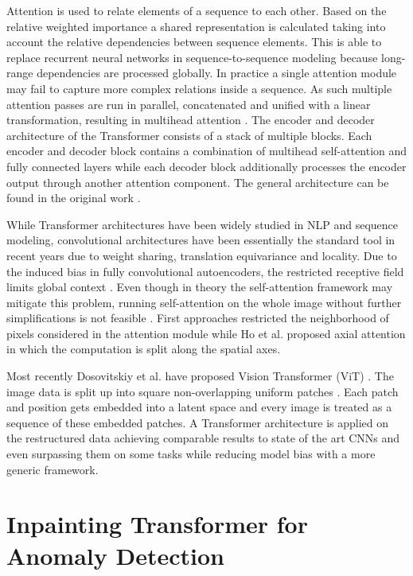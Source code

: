 \documentclass[final,5p,times,twocolumn]{elsarticle}
\begin{document}
	Attention is used to relate elements of a sequence to each other. Based on the relative weighted importance a shared representation is calculated taking into account the relative dependencies between sequence elements.
	This is able to replace recurrent neural networks in sequence-to-sequence modeling because long-range dependencies are processed globally.
	In practice a single attention module may fail to capture more complex relations inside a sequence.
	As such multiple attention passes are run in parallel, concatenated and unified with a linear transformation, resulting in multihead attention \cite{NIPS2017_3f5ee243}.
	The encoder and decoder architecture of the Transformer consists of a stack of multiple blocks.
	Each encoder and decoder block contains a combination of multihead self-attention and fully connected layers while each decoder block additionally processes the encoder output through another attention component.
	The general architecture can be found in the original work \cite{NIPS2017_3f5ee243}.
	
	While Transformer architectures have been widely studied in NLP and sequence modeling, convolutional architectures have been essentially the standard tool in recent years due to weight sharing, translation equivariance and locality.
	Due to the induced bias in fully convolutional autoencoders, the restricted receptive field limits global context \cite{Yu_2018_CVPR}.
	Even though in theory the self-attention framework may mitigate this problem, running self-attention on the whole image without further simplifications is not feasible \cite{ho2019axial, parmar2018image}.
	First approaches restricted the neighborhood of pixels considered in the attention module \cite{parmar2018image} while Ho et al. proposed axial attention in which the computation is split along the spatial axes.
	
	Most recently Dosovitskiy et al. have proposed Vision Transformer (ViT) \cite{dosovitskiy2020}. The image data is split up into square non-overlapping uniform patches \cite{dosovitskiy2020}.
	Each patch and position gets embedded into a latent space and every image is treated as a sequence of these embedded patches.
	A Transformer architecture is applied on the restructured data achieving comparable results to state of the art CNNs and even surpassing them on some tasks while reducing model bias with a more generic framework. 
	
	
	\section{Inpainting Transformer for Anomaly Detection}
	
\end{document}
